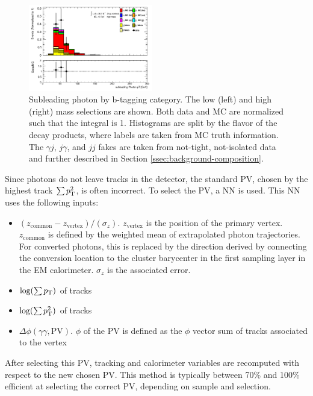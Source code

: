 \begin{figure}[p]
  \includegraphics[width=0.48\textwidth]{chapters/chapter5_yybb/images/data_MC_comparison/h_SR_h_2t_nominal_subleadingPhoton_pt.pdf}
  \caption[Subleading photon \pt by \btagging category]{Subleading photon \pt by b-tagging category. The low (left) and high (right) mass selections are shown. Both data and MC are normalized such that the integral is 1. Histograms are split by the flavor of the \Hbb decay products, where labels are taken from \gls{MC} truth information. The $\gamma j$, $j\gamma$, and $jj$ fakes are taken from not-tight, not-isolated data and further described in Section \ref{ssec:background-composition}.
  \label{fig:photon_s_pt}}
\end{figure}

Since photons do not leave tracks in the detector, the standard \gls{PV}, chosen by the highest track $\sum p_{\text{T}}^2$, is often incorrect. To select the \gls{PV}, a \gls{NN} is used. This \gls{NN} uses the following inputs:
\begin{itemize}
  \item $(z_{\text{common}} - z_{\text{vertex}})/(\sigma_z)$. $z_{\text{vertex}}$ is the position of the primary vertex. $z_{\text{common}}$ is defined by the weighted mean of extrapolated photon trajectories. For converted photons, this is replaced by the direction derived by connecting the conversion location to the cluster barycenter in the first sampling layer in the \gls{EM} calorimeter. $\sigma_z$ is the associated error.
  \item $\log(\sum p_{\text{T}})$ of tracks
  \item $\log(\sum p_{\text{T}}^2)$ of tracks
  \item $\Delta \phi(\gamma\gamma,\text{PV})$. $\phi$ of the \gls{PV} is defined as the $\phi$ vector sum of tracks associated to the vertex
  
\end{itemize}
After selecting this \gls{PV}, tracking and calorimeter variables are recomputed with respect to the new chosen \gls{PV}. This method is typically between 70\% and 100\% efficient at selecting the correct \gls{PV}, depending on sample and selection.


